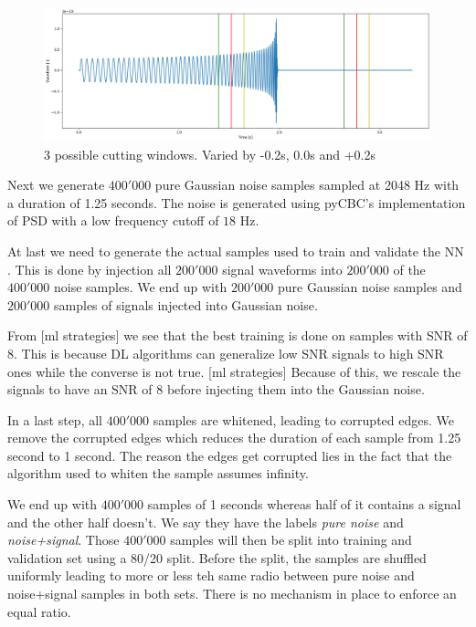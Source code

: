 \begin{figure}[t]
  \includegraphics[width=\textwidth]{img/2_data_generation/chapter2_cutting_window.png}
  \caption{3 possible cutting windows. Varied by -0.2s, 0.0s and +0.2s}
  \label{fig:2_cutting_windows}
  \centering
\end{figure}

Next we generate $400'000$ pure Gaussian noise samples sampled at 2048 Hz with
a duration of 1.25 seconds.
The noise is generated using pyCBC's implementation of
 PSD with a low frequency cutoff of $18$ Hz.

At last we need to generate the actual samples used to train and validate the NN
. This is done by injection all $200'000$ signal waveforms into $200'000$ of the
$400'000$ noise samples. We end up with $200'000$ pure Gaussian noise samples
and $200'000$ samples of signals injected into Gaussian noise.

From [ml strategies] we see that the best training is done on samples with SNR
of 8. This is because DL algorithms can generalize low SNR signals to high SNR
ones while the converse is not true. [ml strategies] Because of this, we rescale
the signals to have an SNR of 8 before injecting them into the Gaussian noise.

In a last step, all $400'000$ samples are whitened, leading to corrupted edges.
We remove the corrupted edges which reduces the duration of each sample from
1.25 second to 1 second. The reason the edges get corrupted lies in the fact
that the algorithm used to whiten the sample assumes infinity.

We end up with $400'000$ samples of 1 seconds whereas half of it contains a signal
and the other half doesn't. We say they have the labels \textit{pure noise} and 
\textit{noise+signal}. Those $400'000$ samples will then be split into
training and validation set using a 80/20 split. Before the split, the samples
are shuffled uniformly leading to more or less teh same radio between
pure noise and noise+signal samples in both sets. There is no mechanism in place
to enforce an equal ratio.

